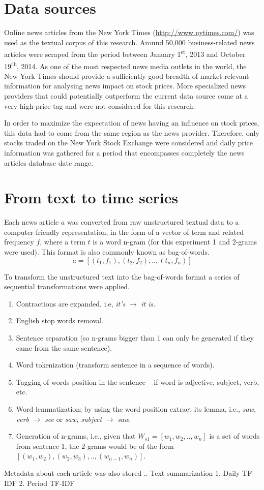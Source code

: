 \documentclass{article}
\begin{document}
\section{Data sources}
Online news articles from the New York Times (\url{http://www.nytimes.com/}) was used as the textual corpus of this research. Around 50,000 business-related news articles were scraped from the period between January 1\textsuperscript{st}, 2013 and October 19\textsuperscript{th}, 2014. As one of the most respected news media outlets in the world, the New York Times should provide a sufficiently good breadth of market relevant information for analysing news impact on stock prices. More specialized news providers that could potentially outperform the current data source come at a very high price tag and were not considered for this research.
\par
In order to maximize the expectation of news having an influence on stock prices, this data had to come from the same region as the news provider. Therefore, only stocks traded on the New York Stock Exchange were considered and daily price information was gathered for a period that encompasses completely the news articles database date range.
\section{From text to time series}
Each news article \(a\) was converted from raw unstructured textual data to a computer-friendly representation, in the form of a vector of term and related frequency \(f\), where a term \(t\) is a word n-gram (for this experiment 1 and 2-grams were used). This format is also commonly known as bag-of-words.
\[a=[(t_1,f_1),(t_2,f_2),..,(t_n,f_n)]\]
\par
To transform the unstructured text into the bag-of-words format a series of sequential transformations were applied.
\begin{enumerate}
\item Contractions are expanded, i.e, \textit{it's} \(\to\) \textit{it is}.
\item English stop words removal.
\item Sentence separation (so n-grams bigger than 1 can only be generated if they came from the same sentence).
\item Word tokenization (transform sentence in a sequence of words).
\item Tagging of words position in the sentence -- if word is adjective, subject, verb, etc.
\item Word lemmatization; by using the word position extract its lemma, i.e., \textit{saw, verb} \(\to\) \textit{see} or \textit{saw, subject} \(\to\) \textit{saw}.
\item Generation of n-grams, i.e., given that \(W_{s1}=[w_1,w_2,..,w_n]\) is a set of words from sentence 1, the 2-grams would be of the form \([(w_1,w_2),(w_2,w_3),..,(w_{n-1},w_n)]\). 
\end{enumerate}
\par
Metadata about each article was also stored
.. Text summarization
1. Daily TF-IDF
2. Period TF-IDF
 
\end{document}
